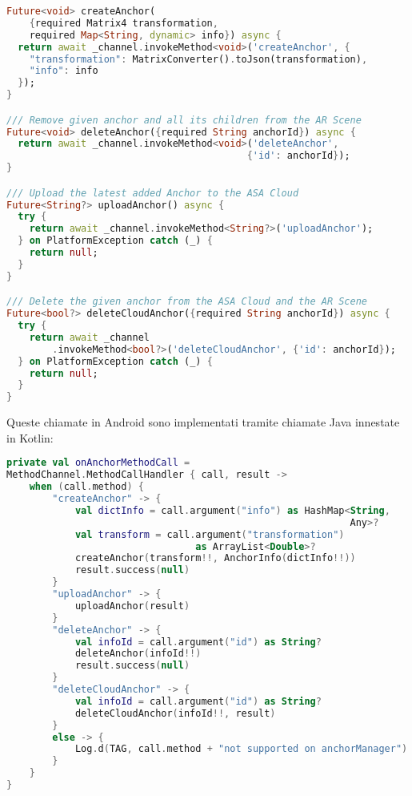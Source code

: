 \begin{lstlisting}[language=dart, label={lst:arplug_manager}, firstnumber=1,caption={\aplug{} \textit{create, delete, ulpoad, delete cloud anchor} tramite \textit{method channel}}]
Future<void> createAnchor(
    {required Matrix4 transformation,
    required Map<String, dynamic> info}) async {
  return await _channel.invokeMethod<void>('createAnchor', {
    "transformation": MatrixConverter().toJson(transformation),
    "info": info
  });
}

/// Remove given anchor and all its children from the AR Scene
Future<void> deleteAnchor({required String anchorId}) async {
  return await _channel.invokeMethod<void>('deleteAnchor',
                                          {'id': anchorId});
}

/// Upload the latest added Anchor to the ASA Cloud
Future<String?> uploadAnchor() async {
  try {
    return await _channel.invokeMethod<String?>('uploadAnchor');
  } on PlatformException catch (_) {
    return null;
  }
}

/// Delete the given anchor from the ASA Cloud and the AR Scene
Future<bool?> deleteCloudAnchor({required String anchorId}) async {
  try {
    return await _channel
        .invokeMethod<bool?>('deleteCloudAnchor', {'id': anchorId});
  } on PlatformException catch (_) {
    return null;
  }
}
\end{lstlisting} 

Queste chiamate in Android sono implementati tramite chiamate Java innestate in Kotlin:

\begin{lstlisting}[language=Kotlin, label={lst:android_channels}, firstnumber=1,caption={Android chiamate dei \textit{method channel} per effettuare \textit{create, delete, ulpoad, delete cloud anchor} tramite \textit{method channel}}]
private val onAnchorMethodCall =
MethodChannel.MethodCallHandler { call, result ->
    when (call.method) {
        "createAnchor" -> {
            val dictInfo = call.argument("info") as HashMap<String,
                                                            Any>?
            val transform = call.argument("transformation") 
                                 as ArrayList<Double>?
            createAnchor(transform!!, AnchorInfo(dictInfo!!))
            result.success(null)
        }
        "uploadAnchor" -> {
            uploadAnchor(result)
        }
        "deleteAnchor" -> {
            val infoId = call.argument("id") as String?
            deleteAnchor(infoId!!)
            result.success(null)
        }
        "deleteCloudAnchor" -> {
            val infoId = call.argument("id") as String?
            deleteCloudAnchor(infoId!!, result)
        }
        else -> {
            Log.d(TAG, call.method + "not supported on anchorManager")
        }
    }
}
\end{lstlisting}

